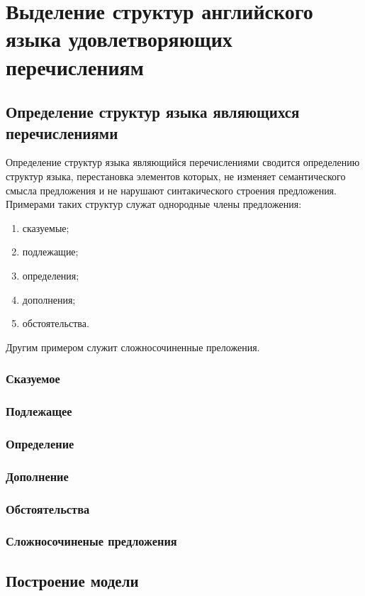 \documentclass{standalone}
\begin{document}
\chapter{Выделение структур английского языка удовлетворяющих перечислениям}%
\ttl
\section{Определение структур языка являющихся перечислениями}
\par Определение структур языка являющийся перечислениями сводится определению структур языка, перестановка элементов которых, не изменяет семантического смысла предложения и не нарушают синтакического строения предложения. Примерами таких структур служат однородные члены предложения:
\begin{enumerate}
    \item сказуемые;
    \item подлежащие;
    \item определения;
    \item дополнения;
    \item обстоятельства.
\end{enumerate}
\par Другим примером служит сложносочиненные преложения.
\subsection{Сказуемое} %
\subsection{Подлежащее} %
\subsection{Определение} %
\subsection{Дополнение} %
\subsection{Обстоятельства} %
\subsection{Сложносочиненые предложения} %

\section{Построение модели}
\end{document}
